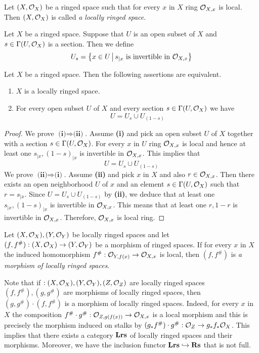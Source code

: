 \begin{definition}
Let $(X,{\mathcal O}_X)$ be a ringed space such that for every $x$ in $X$ ring ${\mathcal O}_{X,x}$ is local. Then $(X,{\mathcal O}_X)$ is called \textit{a locally ringed space}.
\end{definition}
\noindent
Let $X$ be a ringed space. Suppose that $U$ is an open subset of $X$ and $s\in \Gamma(U,{\mathcal O}_X)$ is a section. Then we define
$$U_s = \big\{x\in U\,\big|\,s_{\mid x}\mbox{ is invertible in }{\mathcal O}_{X,x}\big\}$$

\begin{fact}\label{fact:characterizationoflocallyringed}
Let $X$ be a ringed space. Then the following assertions are equivalent.
\begin{enumerate}[label=\emph{\textbf{(\roman*)}}, leftmargin=3.0em]
\item $X$ is a locally ringed space.
\item For every open subset $U$ of $X$ and every section $s\in \Gamma(U,{\mathcal O}_X)$ we have
$$U = U_s\cup U_{(1-s)}$$
\end{enumerate}
\end{fact}
\begin{proof}
We prove $\textbf{(i)} \Rightarrow \textbf{(ii)}$. Assume \textbf{(i)} and pick an open subset $U$ of $X$ together with a section $s\in \Gamma(U,{\mathcal O}_X)$. For every $x$ in $U$ ring ${\mathcal O}_{X,x}$ is local and hence at least one $s_{\mid x}, (1-s)_{\mid x}$ is invertible in ${\mathcal O}_{X,x}$. This implies that
$$U = U_s\cup U_{(1-s)}$$
We prove $\textbf{(ii)} \Rightarrow \textbf{(i)}$. Assume \textbf{(ii)} and pick $x$ in $X$ and also $r\in {\mathcal O}_{X,x}$. Then there exists an open neighborhood $U$ of $x$ and an element $s\in \Gamma(U,{\mathcal O}_X)$ such that $r = s_{\mid x}$. Since $U = U_s\cup U_{(1-s)}$ by \textbf{(ii)}, we deduce that at least one $s_{\mid x}, (1-s)_{\mid x}$ is invertible in ${\mathcal O}_{X,x}$. This means that at least one $r, 1-r$ is invertible in ${\mathcal O}_{X,x}$. Therefore, ${\mathcal O}_{X,x}$ is local ring.
\end{proof}

\begin{definition}
Let $(X,{\mathcal O}_X), (Y,{\mathcal O}_Y)$ be locally ringed spaces and let $(f,f^{\#}):(X,{\mathcal O}_X)\rightarrow (Y,{\mathcal O}_Y)$ be a morphism of ringed spaces. If for every $x$ in $X$ the induced homomorphism $f^{\#}:{\mathcal O}_{Y,f(x)}\rightarrow {\mathcal O}_{X,x}$ is local, then $(f,f^{\#})$ is \textit{a morphism of locally ringed spaces}.
\end{definition}
\noindent
Note that if $:(X,{\mathcal O}_X),(Y,{\mathcal O}_Y),(Z,{\mathcal O}_Z)$ are locally ringed spaces $(f,f^{\#}),(g,g^{\#})$ are morphisms of locally ringed spaces, then $(g,g^{\#})\cdot (f,f^{\#})$ is a morphism of locally ringed spaces. Indeed, for every $x$ in $X$ the composition $f^{\#}\cdot g^{\#}:{\mathcal O}_{Z,g(f(x))}\rightarrow {\mathcal O}_{X,x}$ is a local morphism and this is precisely the morphism induced on stalks by $(g_*f^{\#})\cdot g^{\#}:{\mathcal O}_Z\rightarrow g_*f_*{\mathcal O}_X$. This implies that there exists a category $\mathbf{Lrs}$ of locally ringed spaces and their morphisms. Moreover, we have the inclusion functor $\mathbf{Lrs}\hookrightarrow \mathbf{Rs}$ that is not full.

